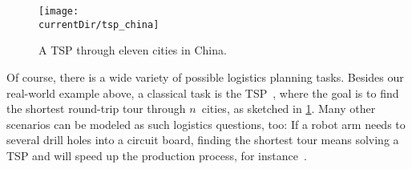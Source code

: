 \begin{figure}%
\centering%
\texttt{[image: \\currentDir/tsp\_china]}%
\caption{A \acrfull{TSP} through eleven cities in China.}%
\label{fig:tsp_china}%
\end{figure}%
%
Of course, there is a wide variety of possible logistics planning tasks.
Besides our real-world example above, a classical task is the \acrfull{TSP}~\cite{ABCC2006TTSPACS,LLRKS1985TTSPAGTOCO,GP2002TTSPAIV}, where the goal is to find the shortest round-trip tour through $n$~cities, as sketched in \cref{fig:tsp_china}.
Many other scenarios can be modeled as such logistics questions, too:
If a robot arm needs to several drill holes into a circuit board, finding the shortest tour means solving a \gls{TSP} and will speed up the production process, for instance~\cite{GJR1991OCOPADMACS}.%
\endhsection%
%
